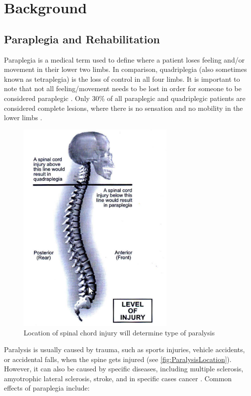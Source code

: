 \chapter{Background}

\section{Paraplegia and Rehabilitation}
Paraplegia is a medical term used to define where a patient loses feeling and/or movement in their lower two limbs. In comparison, quadriplegia (also sometimes known as tetraplegia) is the loss of control in all four limbs. It is important to note that not all feeling/movement needs to be lost in order for someone to be considered paraplegic \cite{IncompleteTraumaticQuadrilegia}. Only 30\% of all paraplegic and quadriplegic patients are considered complete lesions, where there is no sensation and no mobility in the lower limbs \cite{RehabParaplegia}. 

\begin{figure} [h!]
    \centering
    \includegraphics[width=0.5\linewidth]{Figures/Background/ParaQuadInjuryLocs.png}
    \caption{Location of spinal chord injury will determine type of paralysis \cite{RehabParaplegia}}
    \label{fig:ParalysisLocation}
\end{figure}

Paralysis is usually caused by trauma, such as sports injuries, vehicle accidents, or accidental falls, when the spine gets injured (see \autoref{fig:ParalysisLocation}). However, it can also be caused by specific diseases, including multiple sclerosis, amyotrophic lateral sclerosis, stroke, and in specific cases cancer \cite{CausesParaplegia}. Common effects of paraplegia include:
 
